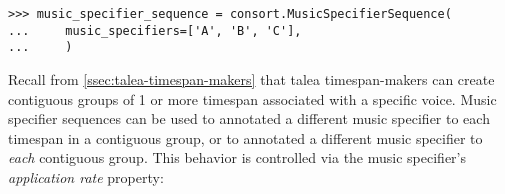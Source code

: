 \begin{comment}
<abjad>
music_specifier_sequence = consort.MusicSpecifierSequence(
    music_specifiers=['A', 'B', 'C'],
    )
</abjad>
\end{comment}

\begin{abjadbookoutput}
\begin{singlespacing}
\vspace{-0.5\baselineskip}
\begin{verbatim}
>>> music_specifier_sequence = consort.MusicSpecifierSequence(
...     music_specifiers=['A', 'B', 'C'],
...     )
\end{verbatim}
\end{singlespacing}
\end{abjadbookoutput}

\noindent Recall from \autoref{ssec:talea-timespan-makers} that talea
timespan-makers can create contiguous groups of 1 or more timespan associated
with a specific voice. Music specifier sequences can be used to annotated a
different music specifier to each timespan in a contiguous group, or to
annotated a different music specifier to \emph{each} contiguous group. This
behavior is controlled via the music specifier's \emph{application rate}
property:

\begin{comment}
<abjad>
music_specifiers = {'Voice': music_specifier_sequence}
target_timespan = timespantools.Timespan(0, (7, 4))
timespan_maker = consort.TaleaTimespanMaker(
    playing_groupings=(3,),
    )
timespan_inventory = timespan_maker(
    music_specifiers=music_specifiers,
    target_timespan=target_timespan,
    )
print(format(timespan_inventory))
</abjad>
\end{comment}

